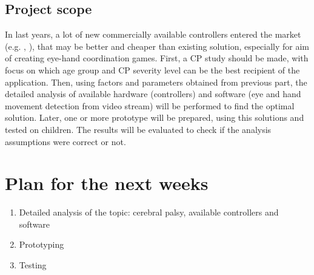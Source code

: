 \documentclass[10pt,a4paper]{article}
\begin{document}
\subsection*{Project scope}
In last years, a lot of new commercially available controllers entered the market (e.g. \cite{Leap}, \cite{TheEyeTribe}), that may be better and cheaper  than existing solution, especially for aim of creating eye-hand coordination games. First, a CP study should be made, with focus on which age group and CP severity level can be the best recipient of the application. Then, using factors and parameters obtained from previous part, the detailed analysis of available hardware (controllers) and software (eye and hand movement detection from video stream) will be performed to find the optimal solution.
Later, one or more prototype will be prepared, using this solutions and tested on children. The results will be evaluated to check if the analysis assumptions were correct or not. 

\section*{Plan for the next weeks}

\begin{enumerate}
\item Detailed analysis of the topic: cerebral palsy, available controllers and software
\item Prototyping
\item Testing
\end{enumerate}


 

\end{document}
